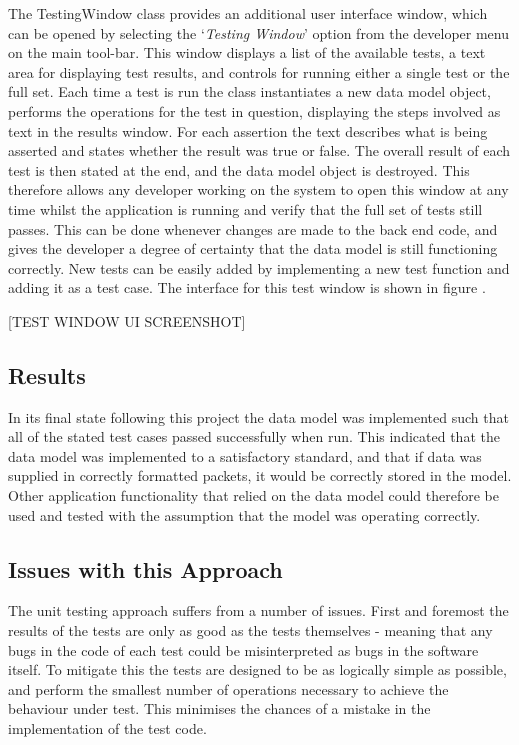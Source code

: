 The TestingWindow class provides an additional user interface window, which can be opened by selecting the `\textit{Testing Window}' option from the developer menu on the main tool-bar. This window displays a list of the available tests, a text area for displaying test results, and controls for running either a single test or the full set. Each time a test is run the class instantiates a new data model object, performs the operations for the test in question, displaying the steps involved as text in the results window. For each assertion the text describes what is being asserted and states whether the result was true or false. The overall result of each test is then stated at the end, and the data model object is destroyed. This therefore allows any developer working on the system to open this window at any time whilst the application is running and verify that the full set of tests still passes. This can be done whenever changes are made to the back end code, and gives the developer a degree of certainty that the data model is still functioning correctly. New tests can be easily added by implementing a new test function and adding it as a test case. The interface for this test window is shown in figure .

[TEST WINDOW UI SCREENSHOT]

\subsection{Results}
In its final state following this project the data model was implemented such that all of the stated test cases passed successfully when run. This indicated that the data model was implemented to a satisfactory standard, and that if data was supplied in correctly formatted packets, it would be correctly stored in the model. Other application functionality that relied on the data model could therefore be used and tested with the assumption that the model was operating correctly.

\subsection{Issues with this Approach}
The unit testing approach suffers from a number of issues. First and foremost the results of the tests are only as good as the tests themselves - meaning that any bugs in the code of each test could be misinterpreted as bugs in the software itself. To mitigate this the tests are designed to be as logically simple as possible, and perform the smallest number of operations necessary to achieve the behaviour under test. This minimises the chances of a mistake in the implementation of the test code. 


